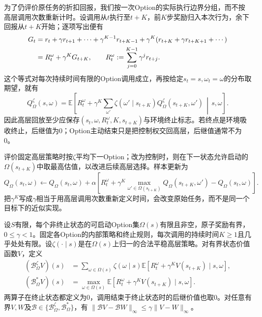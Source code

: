为了仍评价原任务的折扣回报，我们按一次Option的实际执行边界分组，而不按高层调用次数重新计时。设调用从$t$执行至$t+K$，前$K$步奖励归入本次行为，余下回报从$t+K$开始；逐项写出便有
\begin{align}
 G_t
   &=r_t+\gamma r_{t+1}+\cdots+\gamma^{K-1}r_{t+K-1}
          +\gamma^K(r_{t+K}+\gamma r_{t+K+1}+\cdots)\notag\\
   &=R_t^\omega+\gamma^K G_{t+K},\qquad
 R_t^\omega:=\sum_{j=0}^{K-1}\gamma^j r_{t+j}.
 \label{eq:rl-learning-option-grouping}
\end{align}
这个等式对每次持续时间有限的Option调用成立，再按给定$s_t=s,\omega_t=\omega$的分布取期望，就有
\begin{equation}
 Q^\zeta_\Omega(s,\omega)
  =\mathbb E\left[
       R_t^\omega+\gamma^K
          \sum_{\omega'}\zeta(\omega'\mid s_{t+K})
                       Q^\zeta_\Omega(s_{t+K},\omega')
                    \,\middle|\,s,\omega\right].
 \label{eq:rl-learning-option-bellman}
\end{equation}
因此高层回放至少应保存$(s_t,\omega,R_t^\omega,K,s_{t+K})$与环境终止标志。若终点是环境吸收终止，后继值为0；Option主动结束只是把控制权交回高层，后继值通常不为0。

评价固定高层策略时按$\zeta$平均下一Option；改为控制时，则在下一状态允许启动的$\Omega(s_{t+K})$中取最高估值，以改进后续高层选择。样本更新为
\[
 Q_\Omega(s_t,\omega)\leftarrow Q_\Omega(s_t,\omega)+
  \alpha\left[R_t^\omega+
        \gamma^K\max_{\omega'\in\Omega(s_{t+K})}
                          Q_\Omega(s_{t+K},\omega')
                     -Q_\Omega(s_t,\omega)\right].
\]
把$\gamma^K$写成$\gamma$相当于用高层调用次数重新定义时间，会改变原始任务，而不是同一个目标下的近似实现。

\begin{theorem}[Option备份的压缩性]
  \label{thm:rl-learning-option-contraction}
  设$S$有限，每个非终止状态的可启动Option集$\Omega(s)$有限且非空，原子奖励有界，$0\leq\gamma<1$。固定各Option的内部策略和终止规则，每次调用的持续时间$K\geq1$且几乎处处有限。设$\zeta(\cdot\mid s)$是在$\Omega(s)$上归一的合法平稳高层策略。对有界状态价值函数$V$，定义
  \[
    \begin{aligned}
    (\mathcal B_\Omega^\zeta V)(s)
       &=\sum_{\omega\in\Omega(s)}\zeta(\omega\mid s)
          \mathbb E[R_t^\omega+\gamma^K V(s_{t+K})\mid s,\omega],\\
    (\mathcal B_\Omega^*V)(s)
       &=\max_{\omega\in\Omega(s)}
          \mathbb E[R_t^\omega+\gamma^K V(s_{t+K})\mid s,\omega].
    \end{aligned}
  \]
  两算子在终止状态都定义为0，调用结束于终止状态时的后继价值也取0。对任意有界$V,W$及$\mathcal B\in\{\mathcal B_\Omega^\zeta,\mathcal B_\Omega^*\}$，有
  $\|\mathcal BV-\mathcal BW\|_\infty\leq\gamma\|V-W\|_\infty$。
\end{theorem}

